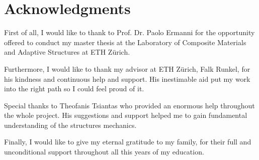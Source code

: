 \section*{Acknowledgments}
First of all, I would like to thank to Prof. Dr. Paolo Ermanni for the opportunity offered to conduct my master thesis at the Laboratory of Composite Materials and Adaptive Structures at ETH Z\"urich.

\noindent
Furthermore, I would like to thank my advisor at ETH Z\"urich, Falk Runkel, for his kindness and continuous help and support. His inestimable aid put my work into the right path so I could feel proud of it.

\noindent
Special thanks to Theofanis Tsiantas who provided an enormous help throughout the whole project. His suggestions and support helped me to gain fundamental understanding of the structures mechanics. 

\noindent
Finally, I would like to give my eternal gratitude to my family, for their full and unconditional support throughout all this years of my education.